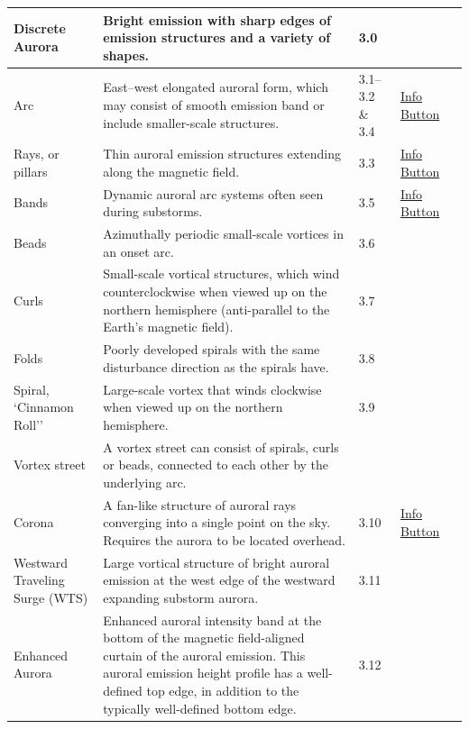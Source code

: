 \documentclass{article}
\begin{document}
\begin{longtable}{|p{1.5cm}|p{6.5cm}|p{1cm}|p{1.75cm}|p{1.8cm}|}
Discrete Aurora & Bright emission with sharp edges of emission structures and a variety of shapes. & 3.0 &  &  \\
\hline
Arc & East--west elongated auroral form, which may consist of smooth emission band or include smaller-scale structures. & 3.1--3.2 \& 3.4 & \href{https://www.taivaanvahti.fi/observations/info/2/en}{Info Button} & \textcite{Karlsson2020}\\
\hline
Rays, or pillars & Thin auroral emission structures extending along the magnetic field. & 3.3 & \href{https://www.taivaanvahti.fi/observations/info/4/en}{Info Button} &  \\
\hline
Bands & Dynamic auroral arc systems often seen during substorms. & 3.5 & \href{https://www.taivaanvahti.fi/observations/info/3/en}{Info Button} &  \\
\hline
Beads & Azimuthally periodic small-scale vortices in an onset arc. & 3.6 &  & \textcite{Motoba2012} \\
\hline
Curls & Small-scale vortical structures, which wind counterclockwise when viewed up on the northern hemisphere (anti-parallel to the Earth's magnetic field). & 3.7 &  & \textcite{Trondsen1998} \\
\hline
Folds & Poorly developed spirals with the same disturbance direction as the spirals have. & 3.8 &  & \textcite{Hallinan1976} \\
\hline
Spiral, `Cinnamon Roll'' & Large-scale vortex that winds clockwise when viewed up on the northern hemisphere. & 3.9 &  & \textcite{Hallinan1976} \\
\hline
Vortex street & A vortex street can consist of spirals, curls or beads, connected to each other by the underlying arc. &  &  &  \\
\hline
Corona & A fan-like structure of auroral rays converging into a single point on the sky. Requires the aurora to be located overhead. & 3.10 & \href{https://www.taivaanvahti.fi/observations/info/6/en}{Info Button} &  \\
\hline
Westward Traveling Surge (WTS) & Large vortical structure of bright auroral emission at the west edge of the westward expanding substorm aurora. & 3.11 &  & \textcite{Wei2021} \\
\hline
Enhanced Aurora & Enhanced auroral intensity band at the bottom of the magnetic field-aligned curtain of the auroral emission. This auroral emission height profile has a well-defined top edge, in addition to the typically well-defined bottom edge. & 3.12 &  & \textcite{Hallinan1997} \\
\hline


\end{longtable}
\end{document}
